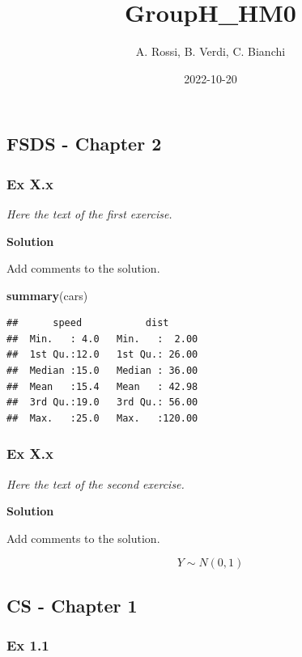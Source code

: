 \documentclass[
]{article}
\title{GroupH\_HM0}
\author{A. Rossi, B. Verdi, C. Bianchi}
\date{2022-10-20}
\newenvironment{Shaded}{\begin{snugshade}}{\end{snugshade}}
\newcommand{\FunctionTok}[1]{\textcolor[rgb]{0.13,0.29,0.53}{\textbf{#1}}}
\newcommand{\NormalTok}[1]{#1}
\begin{document}
\maketitle

{
\setcounter{tocdepth}{3}
\tableofcontents
}
\subsection{FSDS - Chapter 2}\label{fsds---chapter-2}

\subsubsection{Ex X.x}\label{ex-x.x}

\emph{Here the text of the first exercise.}

\textbf{Solution}

Add comments to the solution.

\begin{Shaded}
\begin{Highlighting}[]
\FunctionTok{summary}\NormalTok{(cars)}
\end{Highlighting}
\end{Shaded}

\begin{verbatim}
##      speed           dist       
##  Min.   : 4.0   Min.   :  2.00  
##  1st Qu.:12.0   1st Qu.: 26.00  
##  Median :15.0   Median : 36.00  
##  Mean   :15.4   Mean   : 42.98  
##  3rd Qu.:19.0   3rd Qu.: 56.00  
##  Max.   :25.0   Max.   :120.00
\end{verbatim}

\subsubsection{Ex X.x}\label{ex-x.x-1}

\emph{Here the text of the second exercise.}

\textbf{Solution}

Add comments to the solution.

\[ Y \sim N(0,1)\]

\subsection{CS - Chapter 1}\label{cs---chapter-1}

\subsubsection{Ex 1.1}\label{ex-1.1}
\end{document}
